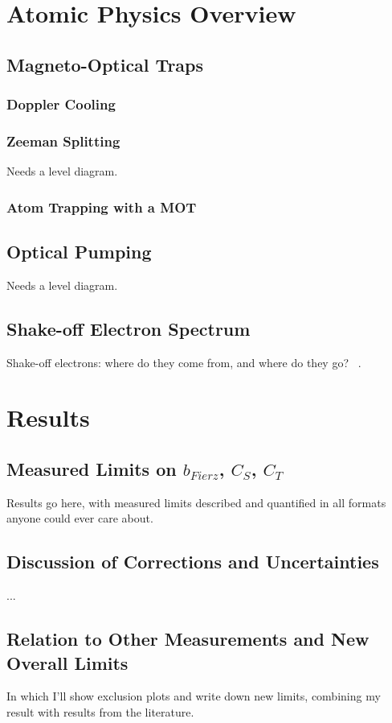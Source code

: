 \clearpage
\chapter{Atomic Physics Overview}
\label{atomicphysics_chapter}
\section{Magneto-Optical Traps}
	\subsection{Doppler Cooling}
	\subsection{Zeeman Splitting}
	Needs a level diagram.
	\subsection{Atom Trapping with a MOT}

\section{Optical Pumping}
Needs a level diagram.


\section{Shake-off Electron Spectrum}
Shake-off electrons:  where do they come from, and where do they go?  ~\cite{Levinger}.

















\clearpage	
\chapter{Results}

\section{Measured Limits on $b_{Fierz}$, $C_S$, $C_T$}
	Results go here, with measured limits described and quantified in all formats anyone could ever care about.
	
\section{Discussion of Corrections and Uncertainties}
	...
	
\section{Relation to Other Measurements and New Overall Limits}
	In which I'll show exclusion plots and write down new limits, combining my result with results from the literature.


